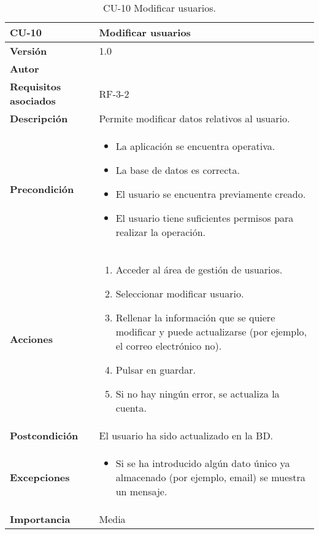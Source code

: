 \begin{table}[p]
	\centering
	\begin{tabularx}{\linewidth}{ p{} p{} }
		\toprule
		\textbf{CU-10}    & \textbf{ Modificar usuarios}\\
		\toprule
		\textbf{Versión}              & 1.0    \\
		\textbf{Autor}                & \@author{} \\
		\textbf{Requisitos asociados} & RF-3-2\\
		\textbf{Descripción}          & Permite modificar datos relativos al usuario. \\
		\textbf{Precondición}         &
		\begin{itemize}
			\tightlist
			\item La aplicación se encuentra operativa.
			\item La base de datos es correcta.
			\item El usuario se encuentra previamente creado.
			\item El usuario tiene suficientes permisos para realizar la operación.
		\end{itemize}\\
		\textbf{Acciones}             &
		\begin{enumerate}
			\tightlist
			\item Acceder al área de gestión de usuarios.
			\item Seleccionar modificar usuario.
			\item Rellenar la información que se quiere modificar y puede actualizarse (por ejemplo, el correo electrónico no).
			\item Pulsar en guardar.
			\item Si no hay ningún error, se actualiza la cuenta.
		\end{enumerate}\\
		\textbf{Postcondición}        & El usuario ha sido actualizado en la BD.\\
		\textbf{Excepciones}          &
		\begin{itemize}
			\tightlist
			\item Si se ha introducido algún dato único ya almacenado (por ejemplo, email) se muestra un mensaje.
		\end{itemize}\\
		\textbf{Importancia}          & Media\\
		\bottomrule
	\end{tabularx}
	\caption{CU-10 Modificar usuarios.}\label{tab:table-10}
\end{table}

